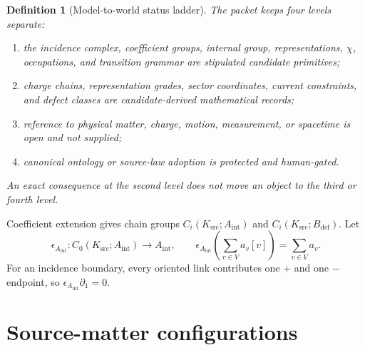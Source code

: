 \documentclass[11pt]{article}
\newtheorem{definition}{Definition}
\newcommand{\Ksrc}{K_{\mathrm{src}}}
\newcommand{\Aint}{A_{\mathrm{int}}}
\newcommand{\Bdef}{B_{\mathrm{def}}}
\begin{document}
\begin{definition}[Model-to-world status ladder]
The packet keeps four levels separate:
\begin{enumerate}[leftmargin=*]
\item the incidence complex, coefficient groups, internal group,
  representations, \(\chi\), occupations, and transition grammar are
  \emph{stipulated candidate primitives};
\item charge chains, representation grades, sector coordinates, current
  constraints, and defect classes are \emph{candidate-derived mathematical
  records};
\item reference to physical matter, charge, motion, measurement, or
  spacetime is \emph{open and not supplied};
\item canonical ontology or source-law adoption is \emph{protected and
  human-gated}.
\end{enumerate}
An exact consequence at the second level does not move an object to the
third or fourth level.
\end{definition}

Coefficient extension gives chain groups
\(C_i(\Ksrc;\Aint)\) and \(C_i(\Ksrc;\Bdef)\). Let
\[
  \epsilon_{\Aint}:C_0(\Ksrc;\Aint)\longrightarrow\Aint,
  \qquad
  \epsilon_{\Aint}\!\left(\sum_{v\in V}a_v[v]\right)
  =\sum_{v\in V}a_v .
\]
For an incidence boundary, every oriented link contributes one \(+\) and one
\(-\) endpoint, so
\(\epsilon_{\Aint}\partial_1=0\).

\section{Source-matter configurations}
\end{document}
